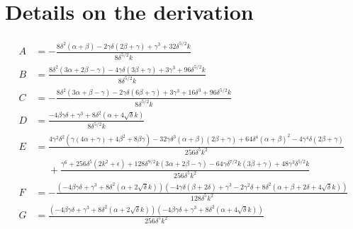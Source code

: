 \documentclass[reprint, amsmath, amssymb, aps, prl]{revtex4-2}
\begin{document}
\section{Details on the derivation}

    \begin{widetext}
    \begin{equation*}
    \begin{split}
        A&=-\frac{8 \delta ^2 (\alpha +\beta )-2 \gamma  \delta  (2 \beta +\gamma )+\gamma ^3+32 \delta ^{5/2} k}{8 \delta ^{5/2} k}\\
        B&= \frac{8 \delta ^2 (3 \alpha +2 \beta -\gamma )-4 \gamma  \delta  (3 \beta +\gamma )+3 \gamma ^3+96 \delta ^{5/2} k}{8 \delta ^{5/2} k}\\
        C&= -\frac{8 \delta ^2 (3 \alpha +\beta -\gamma )-2 \gamma  \delta  (6 \beta +\gamma )+3 \gamma ^3+16 \delta ^3+96 \delta ^{5/2} k}{8 \delta ^{5/2} k}\\
        D&= \frac{-4 \beta  \gamma  \delta +\gamma ^3+8 \delta ^2 \left(\alpha +4 \sqrt{\delta } k\right)}{8 \delta ^{5/2} k}\\
        E&= \frac{4 \gamma ^2 \delta ^2 \left(\gamma  (4 \alpha +\gamma )+4 \beta ^2+8 \beta  \gamma \right)-32 \gamma  \delta ^3 (\alpha +\beta ) (2 \beta +\gamma )+64 \delta ^4 (\alpha +\beta )^2-4 \gamma ^4 \delta  (2 \beta +\gamma )}{256 \delta ^5 k^2}\\
       &\ \ \ \ \ \  +\frac{\gamma ^6+256 \delta ^5 \left(2 k^2+\epsilon \right)+128 \delta ^{9/2} k (3 \alpha +2 \beta -\gamma )-64 \gamma  \delta ^{7/2} k (3 \beta +\gamma )+48 \gamma ^3 \delta ^{5/2} k}{256 \delta ^5 k^2}\\
        F&= -\frac{\left(-4 \beta  \gamma  \delta +\gamma ^3+8 \delta ^2 \left(\alpha +2 \sqrt{\delta } k\right)\right) \left(-4 \gamma  \delta  (\beta +2 \delta )+\gamma ^3-2 \gamma ^2 \delta +8 \delta ^2 \left(\alpha +\beta +2 \delta +4 \sqrt{\delta } k\right)\right)}{128 \delta ^5 k^2}\\
        G&= \frac{\left(-4 \beta  \gamma  \delta +\gamma ^3+8 \delta ^2 \left(\alpha +2 \sqrt{\delta } k\right)\right) \left(-4 \beta  \gamma  \delta +\gamma ^3+8 \delta ^2 \left(\alpha +4 \sqrt{\delta } k\right)\right)}{256 \delta ^5 k^2}
    \end{split}
    \end{equation*}
    \end{widetext}

\nocite{*}

\end{document}
